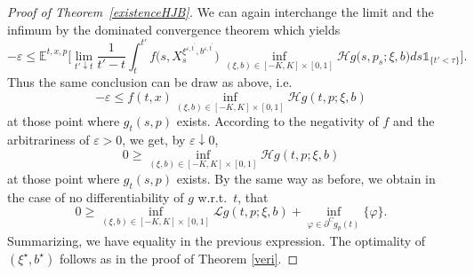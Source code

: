 \documentclass[reqno, 11pt]{amsart}%
\newcommand{\Eop}{\mathbb{E}}
\newcommand{\indicator}{{\mathds 1}}
\newcommand{\Ind}[1]{\indicator_{\{#1\}}}
\theoremstyle{definition}
\numberwithin{equation}{section} \numberwithin{theorem}{section}
\begin{document}
\begin{proof}[Proof of Theorem~\ref{existenceHJB}]
   We can again interchange the limit and the infimum by the dominated convergence theorem which yields 
   \begin{equation*}
   -\varepsilon\le \Eop^{t,x,p}\bigg[\lim_{t'\downarrow t}\frac{1}{t'-t}\int_t^{t'} f\big(s,X^{\xi^{\varepsilon,t^\prime},b^{\varepsilon,t^\prime}}_s\big)\,\inf_{(\xi,b)\in[-K,K]\times[0,1]}\mathcal{H}g\big(s,p_s;\xi,b\big)ds\Ind{t'<\tau}\bigg].
   \end{equation*}
   Thus the same conclusion can be draw as above, i.e. 
   \begin{equation*}
   -\varepsilon \le f(t,x)\inf_{(\xi,b)\in[-K,K]\times[0,1]}\mathcal{H}g(t,p;\xi,b)
   \end{equation*}
   at those point where $g_t(s,p)$ exists. According to the negativity of $f$ and the arbitrariness of $\varepsilon>0$, we get, by $\varepsilon\downarrow0$,
   \begin{equation*}
   0 \ge \inf_{(\xi,b)\in[-K,K]\times[0,1]}\mathcal{H}g(t,p;\xi,b)
   \end{equation*}
   at those point where $g_t(s,p)$ exists.
   By the same way as before, we obtain in the case of no differentiability of $g$ w.r.t.\ $t$, that 
   \begin{equation*}
   0 \ge \inf_{(\xi,b)\in[-K,K]\times[0,1]}\mathcal{L}g(t,p;\xi,b) + \inf_{\varphi\in\partial^C g_p(t)}\{\varphi\}.
   \end{equation*}
   Summarizing, we have equality in the previous expression.
   The optimality of $(\xi^{\star},b^{\star})$  follows as in the proof of Theorem \ref{veri}.
\end{proof}






%


\end{document}
